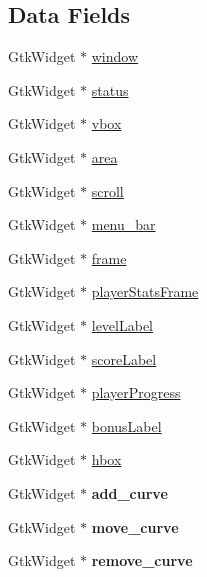 \subsection*{Data Fields}
\begin{DoxyCompactItemize}
\item 
Gtk\+Widget $\ast$ \hyperlink{struct_mydata_a3d346c08cf2d67c388caabffb412b293}{window}
\item 
Gtk\+Widget $\ast$ \hyperlink{struct_mydata_ab8c991d830297ad3502ab72c109e6fe7}{status}
\item 
Gtk\+Widget $\ast$ \hyperlink{struct_mydata_a4135ce280f2ff654540c78e33ce96228}{vbox}
\item 
Gtk\+Widget $\ast$ \hyperlink{struct_mydata_a790d57ae229197048b24b1b0fdacc701}{area}
\item 
Gtk\+Widget $\ast$ \hyperlink{struct_mydata_abf79962e7a3ee4a5c5ef80b4058ce491}{scroll}
\item 
Gtk\+Widget $\ast$ \hyperlink{struct_mydata_ad2f34f578fffe42cf2686e61f2dd85bf}{menu\+\_\+bar}
\item 
Gtk\+Widget $\ast$ \hyperlink{struct_mydata_aa96506ac11851965d0f25b0c9eb53885}{frame}
\item 
Gtk\+Widget $\ast$ \hyperlink{struct_mydata_ad9fd4a843722e81542171abbef74f968}{player\+Stats\+Frame}
\item 
Gtk\+Widget $\ast$ \hyperlink{struct_mydata_a27bc5fb5d105194b992c82a95d408222}{level\+Label}
\item 
Gtk\+Widget $\ast$ \hyperlink{struct_mydata_ae067b2d6b08b38aa73b035c82d9e14b0}{score\+Label}
\item 
Gtk\+Widget $\ast$ \hyperlink{struct_mydata_a8f7df3b38dd2aa1d9d7e1bf4276c1d53}{player\+Progress}
\item 
Gtk\+Widget $\ast$ \hyperlink{struct_mydata_ab7e5d6396dfecd2bc73d0114bf4de49c}{bonus\+Label}
\item 
Gtk\+Widget $\ast$ \hyperlink{struct_mydata_a1eed6d0ed7438018e0d938fce66d265d}{hbox}
\item 
Gtk\+Widget $\ast$ {\bfseries add\+\_\+curve}\hypertarget{struct_mydata_afa41b812a39706ff35d77f730089dbf1}{}\label{struct_mydata_afa41b812a39706ff35d77f730089dbf1}

\item 
Gtk\+Widget $\ast$ {\bfseries move\+\_\+curve}\hypertarget{struct_mydata_a62f7075fccfcca150953f1b266bc86d6}{}\label{struct_mydata_a62f7075fccfcca150953f1b266bc86d6}

\item 
Gtk\+Widget $\ast$ {\bfseries remove\+\_\+curve}\hypertarget{struct_mydata_a475e6d0f2736d7bd94a895fe0423569a}{}\label{struct_mydata_a475e6d0f2736d7bd94a895fe0423569a}


\end{DoxyCompactItemize}

